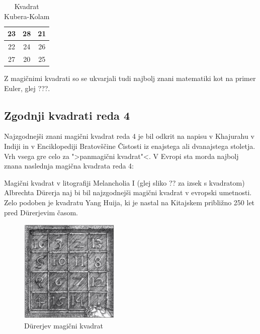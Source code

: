 \documentclass[a4paper,12pt]{article}
\begin{document}
\begin{table}[h!]
   \centering
   \caption{Kvadrat Kubera-Kolam}
   \label{kubera}
   \begin{tabular}{|c|c|c|}
      \hline
      23 & 28 & 21 \\ \hline
      22 & 24 & 26 \\ \hline
      27 & 20 & 25 \\ \hline
   \end{tabular}
\end{table}

      Z magičnimi kvadrati so se ukvarjali tudi najbolj znani matematiki kot na
primer Euler, glej ???. %


\subsection{Zgodnji kvadrati reda 4}

Najzgodnejši znani magični kvadrat reda 4 je bil odkrit na napisu
v Khajurahu v Indiji in v Enciklopediji Bratovščine Čistosti iz enajstega
ali dvanajstega stoletja. Vrh vsega gre celo za ">panmagični kvadrat"<.
V Evropi sta morda najbolj znana naslednja magična kvadrata reda 4:

Magični kvadrat v litografiji Melancholia I (glej sliko ??
za izsek s kvadratom) Albrechta Dürerja naj bi bil najzgodnejši magični kvadrat
v evropski umetnosti. Zelo podoben je kvadratu Yang Huija, ki je nastal na Kitajskem
približno 250 let pred Dürerjevim časom. %

\begin{figure}[h!]
   \centering
   \caption{Dürerjev magični kvadrat}
   \label{fig:durer}
   \includegraphics[scale=1.5]{durer.png}
\end{figure}
\end{document}
